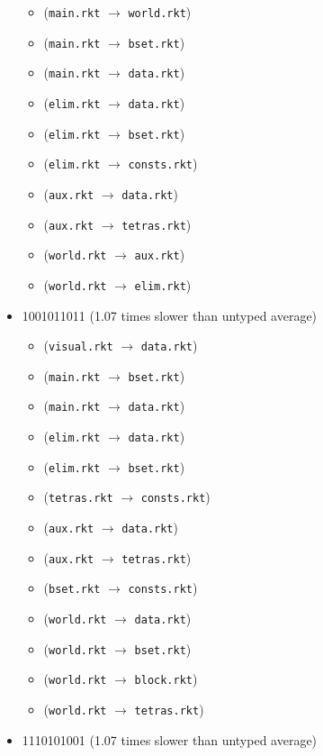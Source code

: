 \documentclass{article}
\newcommand{\mono}[1]{\texttt{#1}}
\begin{document}
\begin{itemize}
\begin{itemize}
  \item (\mono{main.rkt} $\rightarrow$ \mono{world.rkt})
  \item (\mono{main.rkt} $\rightarrow$ \mono{bset.rkt})
  \item (\mono{main.rkt} $\rightarrow$ \mono{data.rkt})
  \item (\mono{elim.rkt} $\rightarrow$ \mono{data.rkt})
  \item (\mono{elim.rkt} $\rightarrow$ \mono{bset.rkt})
  \item (\mono{elim.rkt} $\rightarrow$ \mono{consts.rkt})
  \item (\mono{aux.rkt} $\rightarrow$ \mono{data.rkt})
  \item (\mono{aux.rkt} $\rightarrow$ \mono{tetras.rkt})
  \item (\mono{world.rkt} $\rightarrow$ \mono{aux.rkt})
  \item (\mono{world.rkt} $\rightarrow$ \mono{elim.rkt})
  \end{itemize}
\item 1001011011 (1.07 times slower than untyped average)
  \begin{itemize}
  \item (\mono{visual.rkt} $\rightarrow$ \mono{data.rkt})
  \item (\mono{main.rkt} $\rightarrow$ \mono{bset.rkt})
  \item (\mono{main.rkt} $\rightarrow$ \mono{data.rkt})
  \item (\mono{elim.rkt} $\rightarrow$ \mono{data.rkt})
  \item (\mono{elim.rkt} $\rightarrow$ \mono{bset.rkt})
  \item (\mono{tetras.rkt} $\rightarrow$ \mono{consts.rkt})
  \item (\mono{aux.rkt} $\rightarrow$ \mono{data.rkt})
  \item (\mono{aux.rkt} $\rightarrow$ \mono{tetras.rkt})
  \item (\mono{bset.rkt} $\rightarrow$ \mono{consts.rkt})
  \item (\mono{world.rkt} $\rightarrow$ \mono{data.rkt})
  \item (\mono{world.rkt} $\rightarrow$ \mono{bset.rkt})
  \item (\mono{world.rkt} $\rightarrow$ \mono{block.rkt})
  \item (\mono{world.rkt} $\rightarrow$ \mono{tetras.rkt})
  \end{itemize}
\item 1110101001 (1.07 times slower than untyped average)
  \begin{itemize}

\end{itemize}
\end{itemize}
\end{document}
